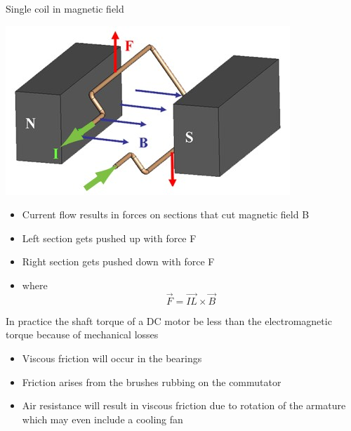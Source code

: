 \documentclass[compress]{beamer}
\begin{document}
\begin{frame}{Single coil in magnetic field}

    \begin{center}
        \includegraphics[width=0.5\linewidth]{image15}
    \end{center}

\begin{itemize}
\item Current flow results in forces on sections that cut magnetic field B
\item Left section gets pushed up with force F
\item Right section gets pushed down with force F
\item where
\[
    \vec{F} = \vec{IL} \times \vec{B}
\]

\end{itemize}


In practice the shaft torque of a DC motor be less than the
electromagnetic torque because of mechanical losses

\begin{itemize}
\item Viscous friction will occur in the bearings
\item Friction arises from the brushes rubbing on the commutator
\item Air resistance will result in viscous friction due to rotation of the
  armature which may even include a cooling fan
\end{itemize}

\end{frame}
\end{document}
